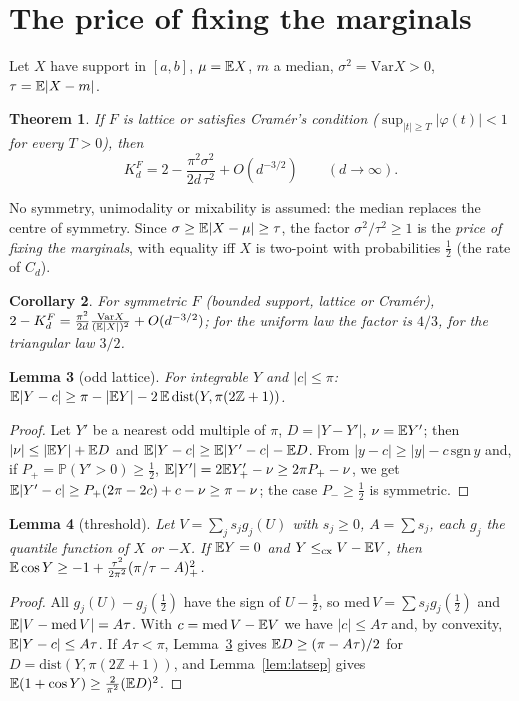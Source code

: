 \documentclass[11pt]{amsart}
\newtheorem{theorem}{Theorem}[section]\newtheorem{proposition}[theorem]{Proposition}\newtheorem{lemma}[theorem]{Lemma}
\newtheorem{corollary}[theorem]{Corollary}\newtheorem{conjecture}[theorem]{Conjecture}
\theoremstyle{definition}\newtheorem{definition}[theorem]{Definition}\theoremstyle{remark}\newtheorem{remark}[theorem]{Remark}
\begin{document}
\section{The price of fixing the marginals}\label{sec:price}
Let $X$ have support in $[a,b]$, $\mu=\mathbb E X$, $m$ a median, $\sigma^2=\mathrm{Var}X>0$, $\tau=\mathbb E|X-m|$.
\begin{theorem}\label{thm:price}
If $F$ is lattice or satisfies Cram\'er's condition ($\sup_{|t|\ge T}|\varphi(t)|<1$ for every $T>0$), then
\[K_d^F=2-\frac{\pi^2\sigma^2}{2d\,\tau^2}+O(d^{-3/2})\qquad(d\to\infty).\]
\end{theorem}
\noindent No symmetry, unimodality or mixability is assumed: the median replaces the centre of symmetry. Since $\sigma\ge\mathbb E|X-\mu|\ge\tau$, the factor
$\sigma^2/\tau^2\ge1$ is the \emph{price of fixing the marginals}, with equality iff $X$ is two-point with probabilities $\frac12$ (the rate of $C_d$).
\begin{corollary}For symmetric $F$ (bounded support, lattice or Cram\'er), $2-K_d^F=\frac{\pi^2}{2d}\frac{\mathrm{Var}X}{(\mathbb E|X|)^2}+O(d^{-3/2})$; for the uniform law
the factor is $4/3$, for the triangular law $3/2$.\end{corollary}
\begin{lemma}[odd lattice]\label{lem:odd}
For integrable $Y$ and $|c|\le\pi$: $\mathbb E|Y-c|\ge\pi-|\mathbb E Y|-2\,\mathbb E\,\mathrm{dist}(Y,\pi(2\mathbb Z+1))$.
\end{lemma}
\begin{proof}Let $Y'$ be a nearest odd multiple of $\pi$, $D=|Y-Y'|$, $\nu=\mathbb E Y'$; then $|\nu|\le|\mathbb E Y|+\mathbb E D$ and $\mathbb E|Y-c|\ge\mathbb E|Y'-c|-\mathbb E D$. From
$|y-c|\ge|y|-c\,\mathrm{sgn}\,y$ and, if $P_+=\mathbb P(Y'>0)\ge\frac12$, $\mathbb E|Y'|=2\mathbb E Y'_+-\nu\ge2\pi P_+-\nu$, we get $\mathbb E|Y'-c|\ge P_+(2\pi-2c)+c-\nu\ge\pi-\nu$;
the case $P_-\ge\frac12$ is symmetric.\end{proof}
\begin{lemma}[threshold]\label{lem:thr}
Let $V=\sum_js_jg_j(U)$ with $s_j\ge0$, $A=\sum s_j$, each $g_j$ the quantile function of $X$ or $-X$. If $\mathbb E Y=0$ and $Y\le_{\mathrm{cx}} V-\mathbb E V$, then
$\mathbb E\cos Y\ge-1+\frac{\tau^2}{2\pi^2}(\pi/\tau-A)_+^2$.
\end{lemma}
\begin{proof}All $g_j(U)-g_j(\frac12)$ have the sign of $U-\frac12$, so $\mathrm{med}\,V=\sum s_jg_j(\frac12)$ and $\mathbb E|V-\mathrm{med}\,V|=A\tau$. With $c=\mathrm{med}\,V-\mathbb E V$ we
have $|c|\le A\tau$ and, by convexity, $\mathbb E|Y-c|\le A\tau$. If $A\tau<\pi$, Lemma~\ref{lem:odd} gives $\mathbb E D\ge(\pi-A\tau)/2$ for $D=\mathrm{dist}(Y,\pi(2\mathbb Z+1))$, and
Lemma~\ref{lem:latsep} gives $\mathbb E(1+\cos Y)\ge\frac2{\pi^2}(\mathbb E D)^2$.\end{proof}
\end{document}
